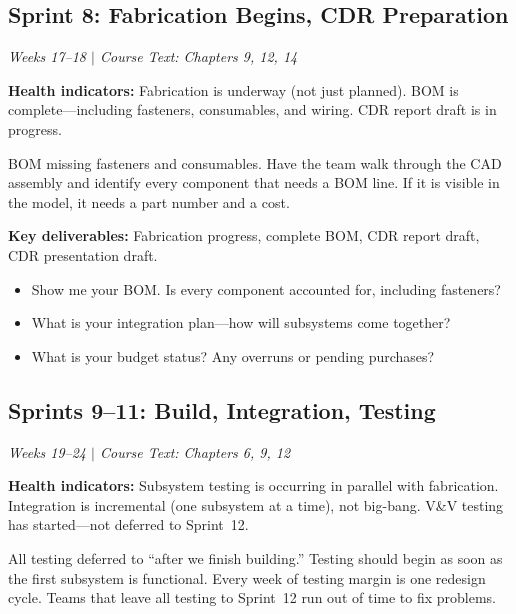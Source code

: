
\subsection{Sprint 8: Fabrication Begins, CDR Preparation}
\textit{Weeks 17--18 $|$ Course Text: Chapters 9, 12, 14}

\textbf{Health indicators:} Fabrication is underway (not just planned). BOM is complete---including fasteners, consumables, and wiring. CDR report draft is in progress.

\begin{redflag}
BOM missing fasteners and consumables. Have the team walk through the CAD assembly and identify every component that needs a BOM line. If it is visible in the model, it needs a part number and a cost.
\end{redflag}

\textbf{Key deliverables:} Fabrication progress, complete BOM, CDR report draft, CDR presentation draft.

\begin{paquestion}
\begin{itemize}[nosep,leftmargin=1.5em]
\item Show me your BOM. Is every component accounted for, including fasteners?
\item What is your integration plan---how will subsystems come together?
\item What is your budget status? Any overruns or pending purchases?
\end{itemize}
\end{paquestion}


\subsection{Sprints 9--11: Build, Integration, Testing}
\textit{Weeks 19--24 $|$ Course Text: Chapters 6, 9, 12}

\textbf{Health indicators:} Subsystem testing is occurring in parallel with fabrication. Integration is incremental (one subsystem at a time), not big-bang. V\&V testing has started---not deferred to Sprint~12.

\begin{redflag}
All testing deferred to ``after we finish building.'' Testing should begin as soon as the first subsystem is functional. Every week of testing margin is one redesign cycle. Teams that leave all testing to Sprint~12 run out of time to fix problems.
\end{redflag}

